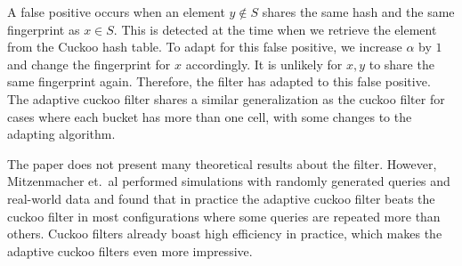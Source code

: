 \documentclass[../paper.tex]{subfiles}
\begin{document}
A false positive occurs when an element $y\not\in S$ shares the same hash and the same fingerprint as $x\in S$. This is detected at the time when we retrieve the element from the
Cuckoo hash table. To adapt for this false positive, we increase $\alpha$ by $1$ and change the fingerprint for $x$ accordingly. It is unlikely for $x,y$ to share the same fingerprint again.
Therefore, the filter has adapted to this false positive. The adaptive cuckoo filter shares a similar generalization as the cuckoo filter for cases where each bucket has more than one cell, with some changes to the adapting algorithm.

The paper does not present many theoretical results about the filter. However, Mitzenmacher et.\ al performed simulations with randomly generated queries and real-world data and found that in practice the adaptive cuckoo filter beats the cuckoo filter in most configurations where some queries are repeated more than others. Cuckoo filters already boast high efficiency in practice, which makes the adaptive cuckoo filters even more impressive.

\end{document}
